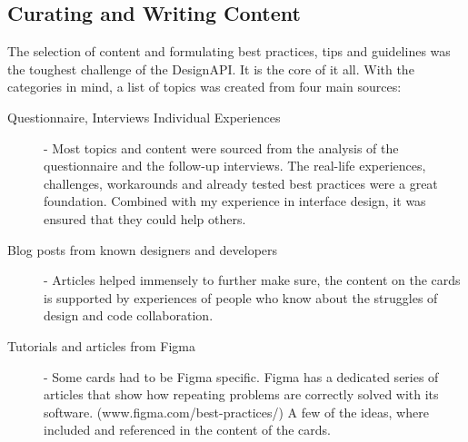 \newpage
\subsection{Curating and Writing Content}
The selection of content and formulating best practices, tips and guidelines was the toughest
challenge of the DesignAPI. It is the core of it all. With the categories in mind, a list of topics
was created from four main sources:

\begin{description}
      \item[Questionnaire, Interviews Individual Experiences] - Most topics and content were sourced
            from the analysis of the questionnaire and the follow-up interviews. The real-life
            experiences, challenges, workarounds and already tested best practices were a great
            foundation. Combined with my experience in interface design, it was ensured that they
            could help others.
      \item[Blog posts from known designers and developers] - Articles helped immensely to further
            make sure, the content on the cards is supported by experiences of people who know about
            the struggles of design and code collaboration.
      \item[Tutorials and articles from Figma] - Some cards had to be Figma specific. Figma has a
            dedicated series of articles that show how repeating problems are correctly solved with
            its software. (www.figma.com/best-practices/) A few of the ideas, where included and
            referenced in the content of the cards.
\end{description}


% 

